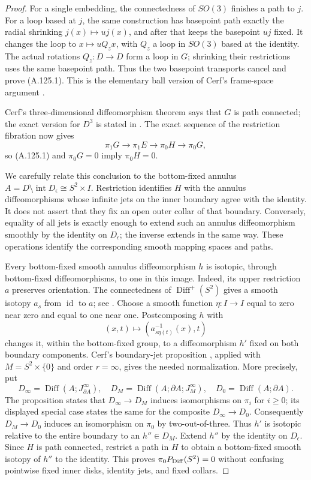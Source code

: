 \begin{proof}
For a single embedding, the connectedness of $SO(3)$ finishes a
path to $j$. For a loop based at $j$, the same construction has
basepoint path exactly the radial shrinking $j(x)\mapsto uj(x)$,
and after that keeps the basepoint $uj$ fixed. It changes the loop
to $x\mapsto uQ_zx$, with $Q_z$ a loop in $SO(3)$ based at the
identity. The actual rotations $Q_z:D\to D$ form a loop in $G$;
shrinking their restrictions uses the same basepoint path.
Thus the two basepoint transports cancel and prove (A.125.1).
This is the elementary ball version of Cerf's frame-space argument
\cite[Proposition~3, p.~8-10]{Cerf1962Fibration}.

Cerf's three-dimensional diffeomorphism theorem says that $G$ is
path connected; the exact version for $D^3$ is stated in
\cite[Chapter~I, Theorem~1.2, p.~8]{Laudenbach1974}.
The exact sequence of the restriction fibration now gives
\[
 \pi_1G\longrightarrow\pi_1E\longrightarrow\pi_0H
       \longrightarrow\pi_0G,
\]
so (A.125.1) and $\pi_0G=0$ imply $\pi_0H=0$.

We carefully relate this conclusion to the bottom-fixed annulus
$A=D\setminus\operatorname{int}D_\epsilon\cong S^2\times I$.
Restriction identifies $H$ with the annulus diffeomorphisms whose
infinite jets on the inner boundary agree with the identity.
It does not assert that they fix an open outer collar of that
boundary. Conversely, equality of all jets is exactly enough to
extend such an annulus diffeomorphism smoothly by the identity on
$D_\epsilon$; the inverse extends in the same way. These operations
identify the corresponding smooth mapping spaces and paths.

Every bottom-fixed smooth annulus diffeomorphism $h$ is isotopic,
through bottom-fixed diffeomorphisms, to one in this image. Indeed,
its upper restriction $a$ preserves orientation. The connectedness
of $\operatorname{Diff}^+(S^2)$ gives a smooth isotopy $a_s$ from
$\operatorname{id}$ to $a$; see
\cite[Theorem~4 and Corollary~2, p.~8-13]{Cerf1962Fibration}.
Choose a smooth function $\eta:I\to I$ equal to zero near zero and
equal to one near one. Postcomposing $h$ with
\[
 (x,t)\longmapsto(a_{s\eta(t)}^{-1}(x),t)
\]
changes it, within the bottom-fixed group, to a diffeomorphism $h'$
fixed on both boundary components. Cerf's boundary-jet proposition
\cite[Proposition~1 and its special case, p.~8-06]{Cerf1962Fibration},
applied with $M=S^2\times\{0\}$ and order $r=\infty$, gives the
needed normalization. More precisely, put
\[
 D_\infty=\operatorname{Diff}(A;J^\infty_{\partial A}),\quad
 D_M=\operatorname{Diff}(A;\partial A;J^\infty_M),\quad
 D_0=\operatorname{Diff}(A;\partial A).
\]
The proposition states that $D_\infty\to D_M$ induces
isomorphisms on $\pi_i$ for $i\geq0$; its displayed special case
states the same for the composite $D_\infty\to D_0$.
Consequently $D_M\to D_0$ induces an isomorphism on $\pi_0$
by two-out-of-three. Thus $h'$ is isotopic relative to the entire
boundary to an $h''\in D_M$. Extend $h''$ by the identity on $D_\epsilon$. Since $H$ is
path connected, restrict a path in $H$ to obtain a bottom-fixed
smooth isotopy of $h''$ to the identity. This proves
$\pi_0P_{\rm Diff}(S^2)=0$ without confusing pointwise fixed inner
disks, identity jets, and fixed collars.


\end{proof}
